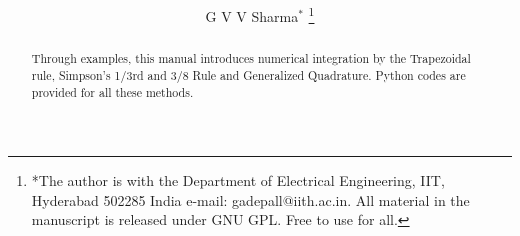 \documentclass[journal,12pt,twocolumn]{IEEEtran}
\begin{document}
\let\StandardTheFigure\thefigure
\renewcommand{\thefigure}{\theproblem}



\def\putbox#1#2#3{\makebox[0in][l]{\makebox[#1][l]{}\raisebox{\baselineskip}[0in][0in]{\raisebox{#2}[0in][0in]{#3}}}}
     \def\rightbox#1{\makebox[0in][r]{#1}}
     \def\centbox#1{\makebox[0in]{#1}}
     \def\topbox#1{\raisebox{-\baselineskip}[0in][0in]{#1}}
     \def\midbox#1{\raisebox{-0.5\baselineskip}[0in][0in]{#1}}

\vspace{3cm}

\title{ 
}

\author{G V V Sharma$^{*}$ %
\thanks{*The author is with the Department
of Electrical Engineering, IIT, Hyderabad
502285 India e-mail: gadepall@iith.ac.in. All material in the manuscript is released under GNU GPL.  Free to use for all.}%
}



\maketitle




\IEEEpeerreviewmaketitle

\bigskip

\begin{abstract}
Through examples, this manual introduces numerical integration by the Trapezoidal rule,
Simpson’s 1/3rd and 3/8 Rule and Generalized Quadrature.
Python codes are provided for all these methods.
\end{abstract}
%
\end{document}
